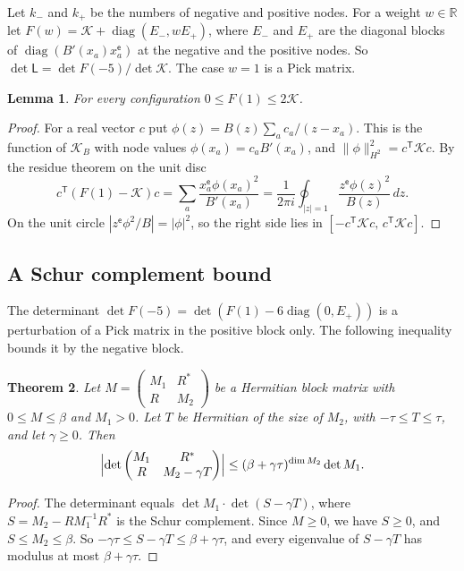 \documentclass[11pt]{amsart}
\newtheorem{theorem}{Theorem}[section]
\newtheorem{lemma}[theorem]{Lemma}
\theoremstyle{definition}
\theoremstyle{remark}
\numberwithin{equation}{section}
\newcommand{\R}{\mathbb R}
\newcommand{\cK}{\mathcal K}
\begin{document}
Let $k_-$ and $k_+$ be the numbers of negative and positive nodes. For a weight $w\in\R$ let
$F(w)=\cK+\operatorname{diag}(E_-,wE_+)$, where $E_-$ and $E_+$ are the diagonal blocks of
$\operatorname{diag}(B'(x_a)x_a^{\mathsf e})$ at the negative and the positive nodes. So
$\det\mathsf L=\det F(-5)/\det\cK$. The case $w=1$ is a Pick matrix.

\begin{lemma}\label{lem:pick}
For every configuration $0\le F(1)\le2\cK$.
\end{lemma}

\begin{proof}
For a real vector $c$ put $\phi(z)=B(z)\sum_ac_a/(z-x_a)$. This is the function of $\cK_B$ with node values
$\phi(x_a)=c_aB'(x_a)$, and $\|\phi\|_{H^2}^2=c^{\mathsf T}\cK c$. By the residue theorem on the unit disc
\[
 c^{\mathsf T}(F(1)-\cK)c=\sum_a\frac{x_a^{\mathsf e}\phi(x_a)^2}{B'(x_a)}=\frac1{2\pi i}\oint_{|z|=1}\frac{z^{\mathsf e}\phi(z)^2}{B(z)}\,dz .
\]
On the unit circle $|z^{\mathsf e}\phi^2/B|=|\phi|^2$, so the right side lies in
$[-c^{\mathsf T}\cK c,\,c^{\mathsf T}\cK c]$.
\end{proof}

\subsection{A Schur complement bound}\label{ssec:schur}
The determinant $\det F(-5)=\det(F(1)-6\operatorname{diag}(0,E_+))$ is a perturbation of a Pick matrix in the
positive block only. The following inequality bounds it by the negative block.

\begin{theorem}\label{thm:C3}
Let $M=\begin{pmatrix}M_1&R^*\\R&M_2\end{pmatrix}$ be a Hermitian block matrix with $0\le M\le\beta$ and
$M_1>0$. Let $T$ be Hermitian of the size of $M_2$, with $-\tau\le T\le\tau$, and let $\gamma\ge0$. Then
\[
 \Bigl|\det\begin{pmatrix}M_1&R^*\\R&M_2-\gamma T\end{pmatrix}\Bigr|\le(\beta+\gamma\tau)^{\dim M_2}\det M_1 .
\]
\end{theorem}

\begin{proof}
The determinant equals $\det M_1\cdot\det(S-\gamma T)$, where $S=M_2-RM_1^{-1}R^*$ is the Schur complement.
Since $M\ge0$, we have $S\ge0$, and $S\le M_2\le\beta$. So $-\gamma\tau\le S-\gamma T\le\beta+\gamma\tau$, and
every eigenvalue of $S-\gamma T$ has modulus at most $\beta+\gamma\tau$.
\end{proof}
\end{document}
